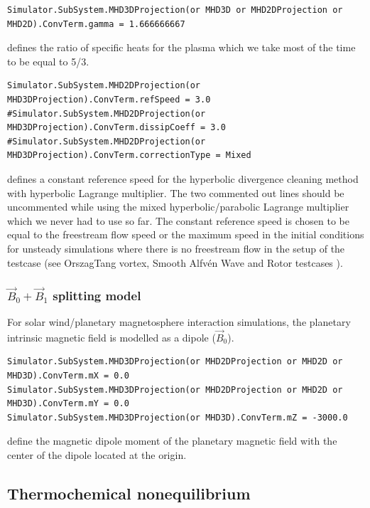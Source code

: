 \documentclass[11pt]{article}
\begin{document}
\begin{lstlisting}[breaklines]
Simulator.SubSystem.MHD3DProjection(or MHD3D or MHD2DProjection or MHD2D).ConvTerm.gamma = 1.666666667
\end{lstlisting}
defines the ratio of specific heats for the plasma which we take most of the time to be equal to 5/3.

\begin{lstlisting}[breaklines]
Simulator.SubSystem.MHD2DProjection(or MHD3DProjection).ConvTerm.refSpeed = 3.0
#Simulator.SubSystem.MHD2DProjection(or MHD3DProjection).ConvTerm.dissipCoeff = 3.0
#Simulator.SubSystem.MHD2DProjection(or MHD3DProjection).ConvTerm.correctionType = Mixed
\end{lstlisting}
defines a constant reference speed for the hyperbolic divergence cleaning method with hyperbolic Lagrange multiplier. The two commented out lines should be uncommented while using the mixed hyperbolic/parabolic Lagrange multiplier \cite{dedner02} which we never had to use so far. The constant reference speed is chosen to be equal to the freestream flow speed or the maximum speed in the initial conditions for unsteady simulations where there is no freestream flow in the setup of the testcase (see OrszagTang vortex, Smooth Alfv\'en Wave and Rotor testcases \cite{yalim11jcp}).  

\subsubsection{$\vec{B}_0+\vec{B}_1$ splitting model}

For solar wind/planetary magnetosphere interaction simulations, the planetary intrinsic magnetic field is modelled as a dipole ($\vec{B}_0$).

\begin{lstlisting}[breaklines]
Simulator.SubSystem.MHD3DProjection(or MHD2DProjection or MHD2D or MHD3D).ConvTerm.mX = 0.0
Simulator.SubSystem.MHD3DProjection(or MHD2DProjection or MHD2D or MHD3D).ConvTerm.mY = 0.0
Simulator.SubSystem.MHD3DProjection(or MHD3D).ConvTerm.mZ = -3000.0
\end{lstlisting}
define the magnetic dipole moment of the planetary magnetic field with the center of the dipole located at the origin.

\subsection{Thermochemical nonequilibrium}
\end{document}
